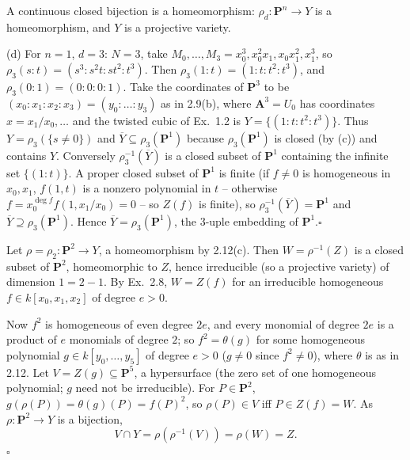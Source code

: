 \documentclass[11pt]{article}
\begin{document}
A continuous closed bijection is a homeomorphism: $\rho_d:\mathbf P^n\to Y$ is a homeomorphism, and $Y$ is a projective variety.

(d) For $n=1$, $d=3$: $N=3$, take $M_0,\dots,M_3=x_0^3,x_0^2x_1,x_0x_1^2,x_1^3$, so $\rho_3(s:t)=(s^3:s^2t:st^2:t^3)$. Then $\rho_3(1:t)=(1:t:t^2:t^3)$, and $\rho_3(0:1)=(0:0:0:1)$. Take the coordinates of $\mathbf P^3$ to be $(x_0:x_1:x_2:x_3)=(y_0:\dots:y_3)$ as in 2.9(b), where $\mathbf A^3=U_0$ has coordinates $x=x_1/x_0,\dots$ and the twisted cubic of Ex.~1.2 is $Y=\{(1:t:t^2:t^3)\}$. Thus $Y=\rho_3(\{s\ne0\})$ and $\overline Y\subseteq\rho_3(\mathbf P^1)$ because $\rho_3(\mathbf P^1)$ is closed (by (c)) and contains $Y$. Conversely $\rho_3^{-1}(\overline Y)$ is a closed subset of $\mathbf P^1$ containing the infinite set $\{(1:t)\}$. A proper closed subset of $\mathbf P^1$ is finite (if $f\neq0$ is homogeneous in $x_0,x_1$, $f(1,t)$ is a nonzero polynomial in $t$ -- otherwise $f=x_0^{\deg f}f(1,x_1/x_0)=0$ -- so $Z(f)$ is finite), so $\rho_3^{-1}(\overline Y)=\mathbf P^1$ and $\overline Y\supseteq\rho_3(\mathbf P^1)$. Hence $\overline Y=\rho_3(\mathbf P^1)$, the 3-uple embedding of $\mathbf P^1$.\hfill$\square$

\pf
Let $\rho=\rho_2:\mathbf P^2\to Y$, a homeomorphism by 2.12(c). Then $W=\rho^{-1}(Z)$ is a closed subset of $\mathbf P^2$, homeomorphic to $Z$, hence irreducible (so a projective variety) of dimension $1=2-1$. By Ex.~2.8, $W=Z(f)$ for an irreducible homogeneous $f\in k[x_0,x_1,x_2]$ of degree $e>0$.

Now $f^2$ is homogeneous of even degree $2e$, and every monomial of degree $2e$ is a product of $e$ monomials of degree $2$; so $f^2=\theta(g)$ for some homogeneous polynomial $g\in k[y_0,\dots,y_5]$ of degree $e>0$ ($g\ne0$ since $f^2\ne0$), where $\theta$ is as in 2.12. Let $V=Z(g)\subseteq\mathbf P^5$, a hypersurface (the zero set of one homogeneous polynomial; $g$ need not be irreducible). For $P\in\mathbf P^2$, $g(\rho(P))=\theta(g)(P)=f(P)^2$, so $\rho(P)\in V$ iff $P\in Z(f)=W$. As $\rho:\mathbf P^2\to Y$ is a bijection,
\[
V\cap Y=\rho(\rho^{-1}(V))=\rho(W)=Z .
\]\hfill$\square$
\end{document}
